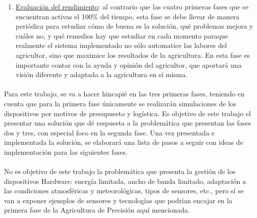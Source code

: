 \documentclass[../../memoria.tex]{subfiles}
\begin{document}
\begin{enumerate}
  \item  \uline{Evaluación del rendimiento}: al contrario que las cuatro primeras fases que se encuentran activas el 100\% del tiempo, esta fase se debe llevar de manera periódica para estudiar cómo de buena es la solución, qué problemas mejora y cuáles no, y qué remedios hay que estudiar en cada momento paraque realmente el sistema implementado no sólo automatice las labores del agricultor, sino que maximice los resultados de la agricultura. En esta fase es importante contar con la ayuda y opinión del agricultor, que aportará una visión diferente y adaptada a la agricultura en sí misma.
\end{enumerate}

\paragraph{}
Para este trabajo, se va a hacer hincapié en las tres primeras fases, teniendo en cuenta que para la primera fase únicamente se realizarán simulaciones de los dispositivos por motivos de presupuesto y logística. Es objetivo de este trabajo el presentar una solución que dé respuesta a la problemática que presentan las fases dos y tres, con especial foco en la segunda fase. Una vez presentada e implementada la solución, se elaborará una lista de pasos a seguir con ideas de implementación para las siguientes fases.

\paragraph{}
No es objetivo de este trabajo la problemática que presenta la gestión de los dispositivos Hardware: energía limitada, ancho de banda limitado, adaptación a las condiciones atmosféricas y meteorológicas, tipos de sensores, etc., pero sí se van a exponer ejemplos de sensores y tecnologías que podrían encajar en la primera fase de la Agricultura de Precisión aquí mencionada.
\end{document}
